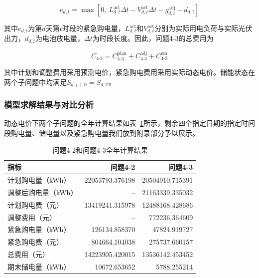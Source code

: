 \documentclass[UTF8]{ctexart}
\begin{document}
    \begin{equation}
        e_{d,t}
        =\max\left[
        0,\ 
        L_{d,t}^{\mathrm{act}}\Delta t
        -V_{d,t}^{\mathrm{act}}\Delta t
        -g_{d,t}^{\mathrm{adj}}
        -d_{d,t}
        \right]
    \end{equation}
    
    其中$e_{d,t}$为第$d$天第$t$时段的紧急购电量，$L_{d,t}^{\mathrm{act}}$和$V_{d,t}^{\mathrm{act}}$分别为实际用电负荷与实际光伏出力，$d_{d,t}$为电池放电量，$\Delta t$为时段长度。因此，问题4-3的总费用为
    
    \begin{equation}
        C_{4\text{-}3}
        =C_{4\text{-}3}^{\mathrm{plan}}
        +C_{4\text{-}3}^{\mathrm{adj}}
        +C_{4\text{-}3}^{\mathrm{em}}
    \end{equation}
    
    其中计划和调整费用采用预测电价，紧急购电费用采用实际动态电价。储能状态在两个子问题中均满足$S_{d+1,0}=S_{d,T}$。\par
    
    \subsubsection{模型求解结果与对比分析}
    
    动态电价下两个子问题的全年计算结果如表~\ref{tab:q4_results}所示，剩余四个指定日期的指定时间段购电量、储电量以及紧急购电量我们放到附录部分予以展示。
    
    \begin{table}[htbp]
        \centering
        \caption{问题4-2和问题4-3全年计算结果}
        \label{tab:q4_results}
        \begin{tabular}{lrr}
            \toprule
            指标 & 问题4-2 & 问题4-3\\
            \midrule
            计划购电量（kWh） & 22053793.376198 & 20504910.715391\\
            调整后购电量（kWh） & -- & 21163339.335032\\
            计划购电费（元） & 13419241.315978 & 12488168.428686\\
            调整费用（元） & -- & 772236.364609\\
            紧急购电量（kWh） & 126134.858370 & 47824.919727\\
            紧急购电费（元） & 804664.104038 & 275737.660157\\
            总费用（元） & 14223905.420015 & 13536142.453452\\
            期末储电量（kWh） & 10672.653652 & 5788.255214\\
            \bottomrule
        \end{tabular}
    \end{table}
    
\end{document}
